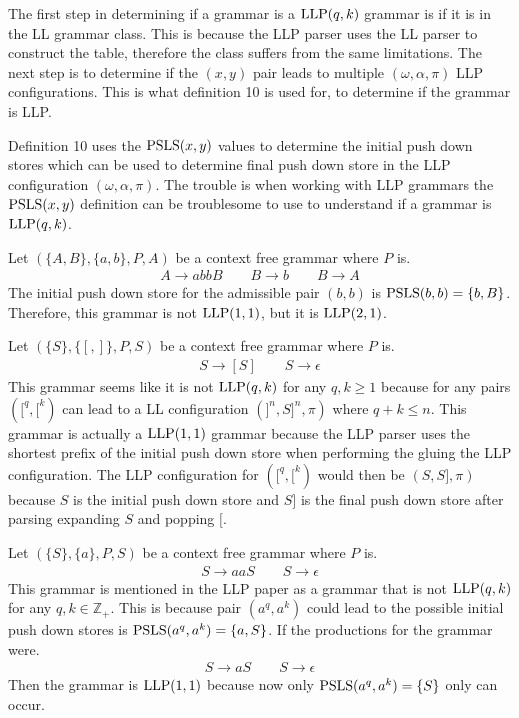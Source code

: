 The first step in determining if a grammar is a $\text{LLP}(q,k)$ grammar is if it is in the LL grammar class. This is because the LLP parser uses the LL parser to construct the table, therefore the class suffers from the same limitations. The next step is to determine if the $(x, y)$ pair leads to multiple $(\omega, \alpha, \pi)$ LLP configurations. This is what definition 10 \cite[13]{Vagner2007} is used for, to determine if the grammar is LLP.

Definition 10 \cite[13]{Vagner2007} uses the $\text{PSLS}(x, y)$ \cite[12]{Vagner2007} values to determine the initial push down stores which can be used to determine final push down store in the LLP configuration $(\omega, \alpha, \pi)$. The trouble is when working with LLP grammars the $\text{PSLS}(x, y)$ definition can be troublesome to use to understand if a grammar is $\text{LLP}(q, k)$.


\begin{example}
    Let $(\{A, B\}, \{a, b\}, P, A)$ be a context free grammar where $P$ is.
    \begin{gather*}
        A \to a b b B \qquad B \to b \qquad B \to A
    \end{gather*}
    The initial push down store for the admissible pair $(b, b)$ is $\text{PSLS}(b, b) = \{b, B\}$. Therefore, this grammar is not $\text{LLP}(1, 1)$, but it is $\text{LLP}(2, 1)$.
\end{example}

\begin{example}
    Let $(\{S\}, \{[, ]\}, P, S)$ be a context free grammar where $P$ is.
    \begin{gather*}
        S \to [S] \qquad S \to \epsilon
    \end{gather*}
    This grammar seems like it is not $\text{LLP}(q, k)$ for any $q, k \geq 1$ because for any pairs $([^q, [^k)$ can lead to a LL configuration $(]^n, S]^n, \pi)$ where $q + k \leq n$. This grammar is actually a $\text{LLP}(1,1)$ grammar because the LLP parser uses the shortest prefix of the initial push down store when performing the gluing the LLP configuration. The LLP configuration for $([^q, [^k)$ would then be $(S, S], \pi)$ because $S$ is the initial push down store and $S]$ is the final push down store after parsing expanding $S$ and popping $[$.
\end{example}


\begin{example}
    Let $(\{S\}, \{a\}, P, S)$ be a context free grammar where $P$ is.
    \begin{gather*}
        S \to aaS \qquad S \to \epsilon
    \end{gather*}
    This grammar is mentioned in the LLP paper \cite[16]{Vagner2007} as a grammar that is not $\text{LLP}(q,k)$ for any $q, k \in \mathbb{Z}_+$. This is because pair $(a^q, a^k)$ could lead to the possible initial push down stores is $\text{PSLS}(a^q, a^k) = \{a, S\}$. If the productions for the grammar were.
    \begin{gather*}
        S \to aS \qquad S \to \epsilon
    \end{gather*}
    Then the grammar is $\text{LLP}(1, 1)$ because now only $\text{PSLS}(a^q, a^k) = \{S\}$ only can occur.
\end{example}